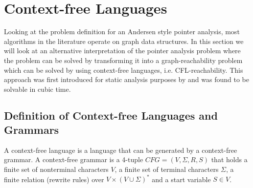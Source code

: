 \section{Context-free Languages}
Looking at the problem definition for an Andersen style pointer analysis, most algorithms in the literature operate on graph data structures.
In this section we will look at an alternative interpretation of the pointer analysis problem where the problem can be solved by transforming it into a graph-reachability problem which can be solved by using context-free languages, i.e. CFL-reachability.
This approach was first introduced for static analysis purposes by \cite{reps1998program} and was found to be solvable in cubic time.

\subsection{Definition of Context-free Languages and Grammars}
A context-free language is a language that can be generated by a context-free grammar.
A context-free grammar is a 4-tuple $CFG=(V,\Sigma,R,S)$ that holds a finite set of nonterminal characters $V$, a finite set of terminal characters $\Sigma$, a finite relation (rewrite rules) over $V\times (V \cup \Sigma)^*$ and a start variable $S \in V$.

